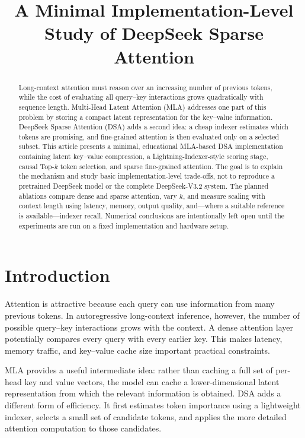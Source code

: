 \documentclass[11pt]{article}
\title{A Minimal Implementation-Level Study of DeepSeek Sparse Attention}
\author{\TODO{Your name}}
\date{\TODO{Publication date}}
\begin{document}
\maketitle

\begin{abstract}
Long-context attention must reason over an increasing number of previous
tokens, while the cost of evaluating all query--key interactions grows
quadratically with sequence length. Multi-Head Latent Attention (MLA) addresses
one part of this problem by storing a compact latent representation for the
key--value information. DeepSeek Sparse Attention (DSA) adds a second idea: a
cheap indexer estimates which tokens are promising, and fine-grained attention
is then evaluated only on a selected subset. This article presents a minimal,
educational MLA-based DSA implementation containing latent key--value
compression, a Lightning-Indexer-style scoring stage, causal Top-$k$ token
selection, and sparse fine-grained attention. The goal is to explain the
mechanism and study basic implementation-level trade-offs, not to reproduce a
pretrained DeepSeek model or the complete DeepSeek-V3.2 system. The planned
ablations compare dense and sparse attention, vary $k$, and measure scaling
with context length using latency, memory, output quality, and—where a suitable
reference is available—indexer recall. Numerical conclusions are intentionally
left open until the experiments are run on a fixed implementation and
hardware setup.
\end{abstract}

\section{Introduction}

Attention is attractive because each query can use information from many
previous tokens. In autoregressive long-context inference, however, the number
of possible query--key interactions grows with the context. A dense attention
layer potentially compares every query with every earlier key. This makes
latency, memory traffic, and key--value cache size important practical
constraints.

MLA provides a useful intermediate idea: rather than caching a full set of
per-head key and value vectors, the model can cache a lower-dimensional latent
representation from which the relevant information is obtained. DSA adds a
different form of efficiency. It first estimates token importance using a
lightweight indexer, selects a small set of candidate tokens, and applies the
more detailed attention computation to those candidates.
\end{document}
